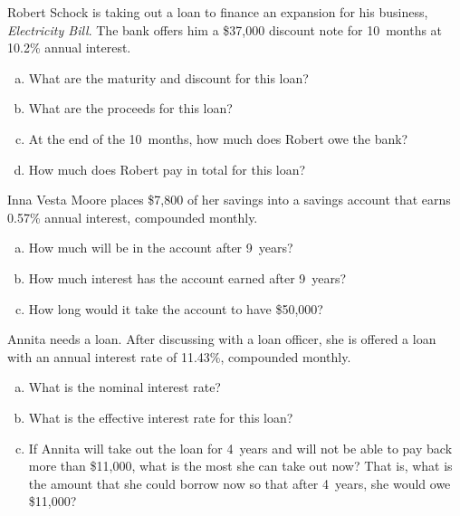 \documentclass[11pt,letterpaper]{article}
\begin{document}

 Robert Schock is taking out a loan to finance an expansion for his business, \textit{Electricity Bill}. The bank offers him a \$37,000 discount note for 10~months at 10.2\% annual interest. 
	\begin{enumerate}[(a)]
	\item What are the maturity and discount for this loan?
	\item What are the proceeds for this loan?
	\item At the end of the 10~months, how much does Robert owe the bank?
	\item How much does Robert pay in total for this loan?
	\end{enumerate}



\newpage



 Inna Vesta Moore places \$7,800 of her savings into a savings account that earns 0.57\% annual interest, compounded monthly. 
	\begin{enumerate}[(a)]
	\item How much will be in the account after 9~years?
	\item How much interest has the account earned after 9~years?
	\item How long would it take the account to have \$50,000?
	\end{enumerate}



\newpage



 Annita needs a loan. After discussing with a loan officer, she is offered a loan with an annual interest rate of 11.43\%, compounded monthly. 
	\begin{enumerate}[(a)]
	\item What is the nominal interest rate?
	\item What is the effective interest rate for this loan?
	\item If Annita will take out the loan for 4~years and will not be able to pay back more than \$11,000, what is the most she can take out now? That is, what is the amount that she could borrow now so that after 4~years, she would owe \$11,000?
	\end{enumerate}
\end{document}
